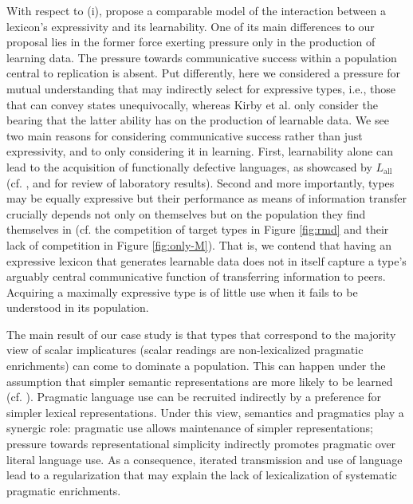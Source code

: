 \documentclass[a4paper, 11pt]{article}
\theoremstyle{Satz}
\newcommand{\mylang}[1]{\ensuremath{L_{\text{#1}}}\xspace} %
\newcommand{\Lall}{\mylang{all}}
\begin{document}
With respect to (i), \citet{kirby+etal:2015} propose a comparable model of the interaction
between a lexicon's expressivity and its learnability. One of its main differences to our proposal lies in 
the former force exerting pressure only in the production of learning data. The pressure towards communicative success 
within a population central to replication is absent. Put differently, here we considered a pressure for mutual understanding 
that may indirectly select for expressive types, i.e., those that can convey states unequivocally, whereas Kirby et al. only
consider the bearing that the latter ability has on the production of learnable data. We see two main reasons
for considering communicative success rather than just expressivity, and to only considering it in learning. First, learnability alone can 
lead to the acquisition of functionally defective languages, as showcased by $\Lall$ (cf. \citealt{kirby+etal:2008,silvey+etal:2014}, and \citealt{fay+etal:2013} for review of laboratory results). Second and more importantly, types may be equally expressive but their performance as means of information transfer crucially depends not only on themselves but on the population they find themselves in (cf. the competition of target types in Figure \ref{fig:rmd} and their lack of competition in Figure \ref{fig:only-M}). That is, we contend that having an expressive lexicon that generates learnable data does not  in itself capture a type's arguably central communicative function of transferring information to peers. Acquiring a maximally expressive type is of little use when it fails to be understood in its population. 

The main result of our case study is that types that correspond to the majority view of scalar
implicatures (scalar readings are non-lexicalized pragmatic enrichments) can come to dominate a
population. This can happen under the assumption that simpler semantic representations are more
likely to be learned (cf. \citealt{chater+vitanyi:2003}). Pragmatic language use can be
recruited indirectly by a preference for simpler lexical representations. Under this view, semantics
and pragmatics play a synergic role: pragmatic use allows maintenance of simpler representations;
pressure towards representational simplicity indirectly promotes pragmatic over literal
language use. As a consequence, iterated transmission and use of language lead to a
regularization that may explain the lack of lexicalization of systematic pragmatic enrichments.
\end{document}
